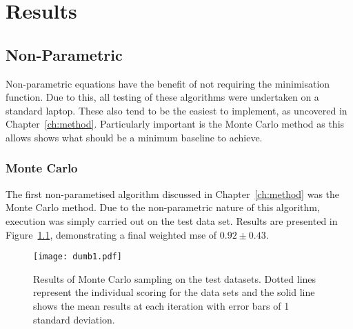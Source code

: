 \chapter{Results}


\graphicspath{{Chapter4/Figs/Vector/}{Chapter4/Figs/}}

\section{Non-Parametric}
Non-parametric equations have the benefit of not requiring the minimisation function. Due to this, all testing of these algorithms were undertaken on a standard laptop. These also tend to be the easiest to implement, as uncovered in Chapter~\ref{ch:method}. Particularly important is the Monte Carlo method as this allows shows what should be a minimum baseline to achieve.

\subsection{Monte Carlo}
The first non-parametised algorithm discussed in Chapter~\ref{ch:method} was the Monte Carlo method. Due to the non-parametric nature of this algorithm, execution was simply carried out on the test data set. Results are presented in Figure~\ref{fig:MCTestSet}, demonstrating a final weighted mse of $0.92\pm{}0.43$.
\begin{figure}[h]
    \begin{center}
        \texttt{[image: dumb1.pdf]}
        \caption[Monte Carlo]{Results of Monte Carlo sampling on the test datasets. Dotted lines represent the individual scoring for the data sets and the solid line shows the mean results at each iteration with error bars of 1 standard deviation.}
        \label{fig:MCTestSet}
    \end{center}
\end{figure}

